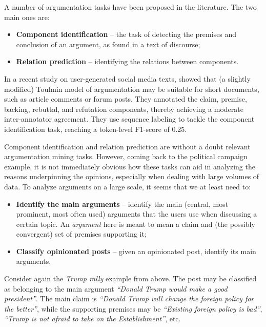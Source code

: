\documentclass[11pt]{article}
\begin{document}
A number of argumentation tasks have been proposed in the literature. The two main ones are:

\begin{itemize}
\item \textbf{Component identification} -- the task of detecting the premises and conclusion of an argument, as found in a text of discourse;
\item \textbf{Relation prediction} -- identifying the relations between components.
\end{itemize}

In a recent study on user-generated social media texts,
 showed that (a slightly modified) Toulmin
model of argumentation may be suitable for short documents, such as article
comments or forum posts. They annotated the claim, premise, backing, rebuttal,
and refutation components, thereby achieving a moderate inter-annotator
agreement. They use sequence labeling to tackle the component identification
task, reaching a token-level F1-score of 0.25.

Component identification and relation prediction are without a doubt relevant
argumentation mining tasks. However, coming back to the political campaign
example, it is not immediately obvious how these tasks can aid in analyzing the
reasons underpinning the opinions, especially when dealing with large volumes
of data. To analyze arguments on a large scale, it seems that we at least need
to:

\begin{itemize}
\item \textbf{Identify the main arguments} -- identify the main (central, most prominent, most often used) arguments that the users use when discussing a certain topic. An \emph{argument} here is meant to mean a claim and (the possibly convergent) set of premises supporting it;
\item \textbf{Classify opinionated posts} -- given an opinionated post, identify its main arguments.
\end{itemize}

Consider again the \emph{Trump rally} example from above. The post may be
classified as belonging to the main argument \emph{``Donald Trump would make a
good president''}. The main claim is \emph{``Donald Trump will change the
foreign policy for the better''}, while the supporting premises may be
\emph{``Existing foreign policy is bad''}, \emph{``Trump is not afraid to take
on the Establishment''}, etc.
\end{document}
